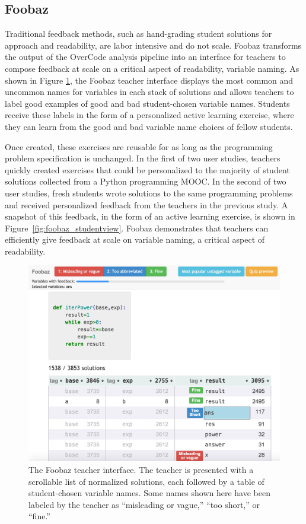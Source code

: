 \subsection{Foobaz}

Traditional feedback methods, such as hand-grading student solutions for approach and readability, are labor intensive and do not scale. Foobaz transforms the output of the OverCode analysis pipeline into an interface for teachers to compose feedback at scale on a critical aspect of readability, variable naming. As shown in Figure \ref{fig:foobaz_teacherview}, the Foobaz teacher interface displays the most common and uncommon names for variables in each stack of solutions and allows teachers to label good examples of good and bad student-chosen variable names. Students receive these labels in the form of a personalized active learning exercise, where they can learn from the good and bad variable name choices of fellow students. 

Once created, these exercises are reusable for as long as the programming problem specification is unchanged. In the first of two user studies, teachers quickly created exercises that could be personalized to the majority of student solutions collected from a Python programming MOOC. In the second of two user studies, fresh students wrote solutions to the same programming problems and received personalized feedback from the teachers in the previous study. A snapshot of this feedback, in the form of an active learning exercise, is shown in Figure~\ref{fig:foobaz_studentview}. Foobaz demonstrates that teachers can efficiently give feedback at scale on variable naming, a critical aspect of readability.


\begin{figure}
\centering
\includegraphics[width=0.75\linewidth]{Body/figures/foobaz/FoobazInitialView4.jpg}
\caption{The Foobaz teacher interface. The teacher is presented with a scrollable list of normalized solutions, each followed by a table of student-chosen variable names. Some names shown here have been labeled by the teacher as ``misleading or vague,'' ``too short,'' or ``fine.''}
\label{fig:foobaz_teacherview}
\end{figure}


